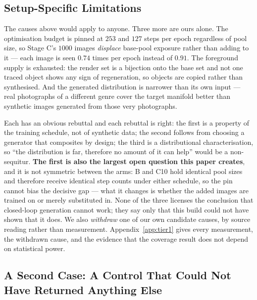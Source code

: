 \documentclass{article} %
\begin{document}
\subsection{Setup-Specific Limitations}
\label{sec:diss-instantiation}

The causes above would apply to anyone. Three more are ours alone. The optimisation budget is pinned
at $253$ and $127$ steps per epoch regardless of pool size, so Stage C's $1000$ images \emph{displace}
base-pool exposure rather than adding to it --- each image is seen $0.74$ times per epoch instead of
$0.91$. The foreground supply is exhausted: the render set is a bijection onto the base set and not
one traced object shows any sign of regeneration, so objects are copied rather than synthesised. And
the generated distribution is narrower than its own input --- real photographs of a different genre
cover the target manifold better than synthetic images generated from those very photographs.

Each has an obvious rebuttal and each rebuttal is right: the first is a property of the training
schedule, not of synthetic data; the second follows from choosing a generator that composites by
design; the third is a distributional characterisation, so ``the distribution is far, therefore no
amount of it can help'' would be a non-sequitur. \textbf{The first is also the largest open question
this paper creates}, and it is not symmetric between the arms: B and C10 hold identical pool sizes
and therefore receive identical step counts under either schedule, so the pin cannot bias the
decisive gap --- what it changes is whether the added images are trained on or merely substituted
in. None of the three licenses the conclusion that closed-loop generation cannot work; they say only
that this build could not have shown that it does. We also \emph{withdraw} one of our own candidate
causes, by source reading rather than measurement. Appendix~\ref{app:tier1} gives every measurement,
the withdrawn cause, and the evidence that the coverage result does not depend on statistical
power.

\subsection{A Second Case: A Control That Could Not Have Returned Anything Else}
\label{sec:contamination}
\end{document}
